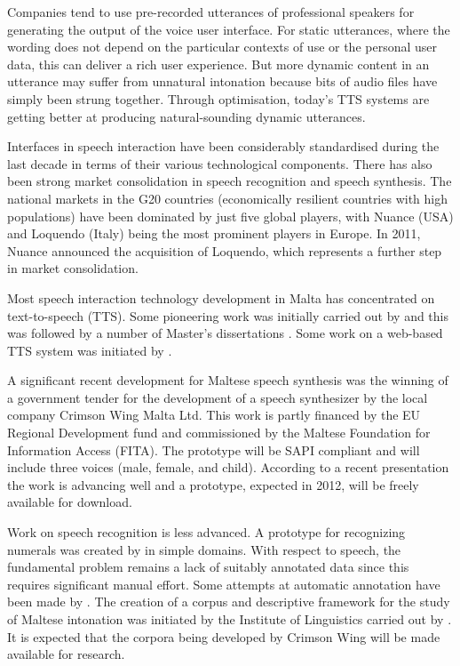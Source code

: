 \documentclass[]{../../metanetpaper}
\begin{document}
\begin{multicols}{2}
Companies tend to use pre-recorded utterances of professional speakers for generating the output of the voice user interface. For static utterances, where the wording does not depend on the particular contexts of use or the personal user data, this can deliver a rich user experience. But more dynamic content in an utterance may suffer from unnatural intonation because bits of audio files have simply been strung together. Through optimisation, today’s TTS systems are getting better at producing natural-sounding dynamic utterances.


Interfaces in speech interaction have been considerably standardised during the last decade in terms of their various technological components. There has also been strong market consolidation in speech recognition and speech synthesis. The national markets in the G20 countries (economically resilient countries with high populations) have been dominated by just five global players, with Nuance (USA) and Loquendo (Italy) being the most prominent players in Europe. In 2011, Nuance announced the acquisition of Loquendo, which represents a further step in market consolidation.

Most speech interaction technology development in Malta has concentrated on text-to-speech (TTS). Some pioneering work was initially carried out by \cite{Micallef:1997} and this was followed by a number of Master’s dissertations \cite{Farrugia:2005}. Some work on a web-based TTS system was initiated by \cite{Buhagiar-Micallef:2008}.

A significant recent development for Maltese speech synthesis was the winning of a government tender for the development of a speech synthesizer by the local company Crimson Wing Malta Ltd. This work is partly financed by the EU Regional Development fund and commissioned by the Maltese Foundation for Information Access (FITA). The prototype will be SAPI compliant and will include three voices (male, female, and child). According to a recent presentation \cite{Borg-et-al:2011} the work is advancing well and a prototype, expected in 2012, will be freely available for download. 

Work on speech recognition is less advanced. A prototype for recognizing numerals was created by \cite{Calleja:2002} in simple domains. With respect to speech, the fundamental problem remains a lack of suitably annotated data since this requires significant manual effort. Some attempts at automatic annotation have been made by \cite{Psaila:2008}. The creation of a corpus and descriptive framework for the study of Maltese intonation was initiated by the Institute of Linguistics carried out by \cite{Vella-Farrugia:2006}. It is expected that the corpora being developed by Crimson Wing will be made available for research.


\end{multicols}
\end{document}
